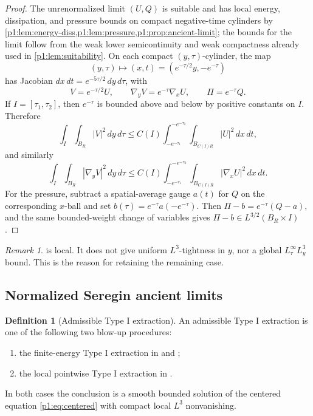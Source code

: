\documentclass[11pt]{amsart}
\theoremstyle{plain}
\theoremstyle{definition}
\newtheorem{definition}[definition]{Definition}
\theoremstyle{remark}
\newtheorem{remark}[remark]{Remark}
\numberwithin{equation}{section}
\begin{document}
\begin{proof}
The unrenormalized limit \((U,Q)\) is suitable and has local energy,
dissipation, and pressure bounds on compact negative-time cylinders by
\cref{p1:lem:energy-diss,p1:lem:pressure,p1:prop:ancient-limit}; the bounds for the
limit follow from the weak lower semicontinuity and weak compactness already
used in \cref{p1:lem:suitability}.  On each compact
\((y,\tau)\)-cylinder, the map
\[
   (y,\tau)\mapsto (x,t)=(e^{-\tau/2}y,-e^{-\tau})
\]
has Jacobian \(dx\,dt=e^{-5\tau/2}\,dy\,d\tau\), with
\[
   V=e^{-\tau/2}U,\qquad
   \nabla_yV=e^{-\tau}\nabla_xU,\qquad
   \Pi=e^{-\tau}Q .
\]
If \(I=[\tau_1,\tau_2]\), then \(e^{-\tau}\) is bounded above and below by
positive constants on \(I\).  Therefore
\[
   \int_I\int_{B_R}|V|^2\,dy\,d\tau
   \le C(I)\int_{-e^{-\tau_1}}^{-e^{-\tau_2}}
       \int_{B_{C(I)R}}|U|^2\,dx\,dt,
\]
and similarly
\[
   \int_I\int_{B_R}|\nabla_yV|^2\,dy\,d\tau
   \le C(I)\int_{-e^{-\tau_1}}^{-e^{-\tau_2}}
       \int_{B_{C(I)R}}|\nabla_xU|^2\,dx\,dt.
\]
For the pressure, subtract a spatial-average gauge \(a(t)\) for \(Q\) on the
corresponding \(x\)-ball and set \(b(\tau)=e^{-\tau}a(-e^{-\tau})\).  Then
\(\Pi-b=e^{-\tau}(Q-a)\), and the same bounded-weight change of variables
gives \(\Pi-b\in L^{3/2}(B_R\times I)\).
\end{proof}

\begin{remark}\label{p1:rem:no-global-tightness}
 is local.  It does not give uniform
\(L^3\)-tightness in \(y\), nor a global \(L^\infty_\tau L^3_y\) bound.  This
is the reason for retaining the remaining case.
\end{remark}

\subsection{Normalized Seregin ancient limits}

\begin{definition}[Admissible Type I extraction]
\label{p1:def:admissible-type-I-extraction}
An admissible Type I extraction is one of the following two blow-up
procedures:
\begin{enumerate}[label=\textup{(\roman*)}]
\item the finite-energy Type I extraction in 
and ;
\item the local pointwise Type I extraction in
.
\end{enumerate}
In both cases the conclusion is a smooth bounded solution of the centered equation
\eqref{p1:eq:centered} with compact local \(L^3\) nonvanishing.
\end{definition}
\end{document}
